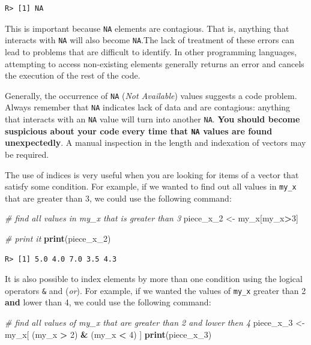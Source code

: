 \documentclass[
  12pt,
]{book}
\newenvironment{Shaded}{\begin{snugshade}}{\end{snugshade}}
\newcommand{\CommentTok}[1]{\textcolor[rgb]{0.37,0.37,0.37}{\textit{#1}}}
\newcommand{\DecValTok}[1]{\textcolor[rgb]{0.06,0.06,0.06}{#1}}
\newcommand{\KeywordTok}[1]{\textcolor[rgb]{0.27,0.27,0.27}{\textbf{#1}}}
\newcommand{\NormalTok}[1]{#1}
\newcommand{\OperatorTok}[1]{\textcolor[rgb]{0.43,0.43,0.43}{\textbf{#1}}}
\newcommand{\StringTok}[1]{\textcolor[rgb]{0.5,0.5,0.5}{#1}}
\newenvironment{rmdimportant}
{\begin{importantblock}
		
	} {\end{importantblock}}
\begin{document}
\begin{verbatim}
R> [1] NA
\end{verbatim}

This is important because \texttt{NA} elements are contagious. That is, anything that interacts with \texttt{NA} will also become \texttt{NA}.The lack of treatment of these errors can lead to problems that are difficult to identify. In other programming languages, attempting to access non-existing elements generally returns an error and cancels the execution of the rest of the code.

\begin{rmdimportant}
Generally, the occurrence of \texttt{NA} (\emph{Not Available}) values
suggests a code problem. Always remember that \texttt{NA} indicates lack
of data and are contagious: anything that interacts with an \texttt{NA}
value will turn into another \texttt{NA}. \textbf{You should become
suspicious about your code every time that \texttt{NA} values are found
unexpectedly}. A manual inspection in the length and indexation of
vectors may be required.
\end{rmdimportant}

The use of indices is very useful when you are looking for items of a vector that satisfy some condition. For example, if we wanted to find out all values in \texttt{my\_x} that are greater than 3, we could use the following command:

\begin{Shaded}
\begin{Highlighting}[]
\CommentTok{# find all values in my_x that is greater than 3}
\NormalTok{piece_x_}\DecValTok{2}\NormalTok{ <-}\StringTok{ }\NormalTok{my_x[my_x}\OperatorTok{>}\DecValTok{3}\NormalTok{]}

\CommentTok{# print it}
\KeywordTok{print}\NormalTok{(piece_x_}\DecValTok{2}\NormalTok{)}
\end{Highlighting}
\end{Shaded}

\begin{verbatim}
R> [1] 5.0 4.0 7.0 3.5 4.3
\end{verbatim}

It is also possible to index elements by more than one condition using the logical operators \texttt{\&} and \texttt{\textbar{}} (\emph{or}). For example, if we wanted the values of \texttt{my\_x} greater than 2 \textbf{and} lower than 4, we could use the following command: 

\begin{Shaded}
\begin{Highlighting}[]
\CommentTok{# find all values of my_x that are greater than 2 and lower then 4}
\NormalTok{piece_x_}\DecValTok{3}\NormalTok{ <-}\StringTok{ }\NormalTok{my_x[ (my_x }\OperatorTok{>}\StringTok{ }\DecValTok{2}\NormalTok{) }\OperatorTok{&}\StringTok{ }\NormalTok{(my_x }\OperatorTok{<}\StringTok{ }\DecValTok{4}\NormalTok{) ]}
\KeywordTok{print}\NormalTok{(piece_x_}\DecValTok{3}\NormalTok{)}
\end{Highlighting}
\end{Shaded}
\end{document}
